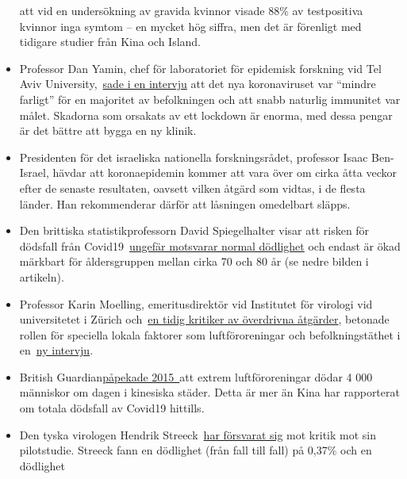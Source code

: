 \begin{itemize}
  att vid en undersökning av gravida kvinnor visade 88\% av testpositiva
  kvinnor inga symtom -- en mycket hög siffra, men det är förenligt med
  tidigare studier från Kina och Island.
\item
  Professor Dan Yamin, chef för laboratoriet för epidemisk forskning vid
  Tel Aviv
  University,~\href{https://www.timesofisrael.com/top-israeli-prof-claims-simple-stats-show-virus-plays-itself-out-after-70-days/}{sade
  i en intervju} att det nya koronaviruset var ``mindre farligt'' för en
  majoritet av befolkningen och att snabb naturlig immunitet var målet.
  Skadorna som orsakats av ett lockdown är enorma, med dessa pengar är
  det bättre att bygga en ny klinik.
\item
  Presidenten för det israeliska nationella forskningsrådet, professor
  Isaac Ben-Israel, hävdar att koronaepidemin kommer att vara över om
  cirka åtta veckor efter de senaste resultaten, oavsett vilken åtgärd
  som vidtas, i de flesta länder. Han rekommenderar därför att låsningen
  omedelbart släpps.
\item
  Den brittiska statistikprofessorn David Spiegelhalter visar att risken
  för dödsfall från
  Covid19~\href{https://medium.com/wintoncentre/how-much-normal-risk-does-covid-represent-4539118e1196}{ungefär
  motsvarar normal dödlighet} och endast är ökad märkbart för
  åldersgruppen mellan cirka 70 och 80 år (se nedre bilden i artikeln).
\item
  Professor Karin Moelling, emeritusdirektör vid Institutet för virologi
  vid universitetet i Zürich
  och~\href{https://www.rubikon.news/artikel/die-stimme-der-vernunft}{en
  tidig kritiker av överdrivna åtgärder}, betonade rollen för speciella
  lokala faktorer som luftföroreningar och befolkningstäthet i
  en~\href{https://www.youtube.com/watch?v=4rl2sqLcDoQ}{ny intervju}.
\item
  British
  Guardian\href{https://www.theguardian.com/world/2015/aug/14/air-pollution-in-china-is-killing-4000-people-every-day-a-new-study-finds}{påpekade
  2015~}att extrem luftföroreningar dödar 4 000 människor om dagen i
  kinesiska städer. Detta är mer än Kina har rapporterat om totala
  dödsfall av Covid19 hittills.
\item
  Den tyska virologen Hendrik
  Streeck~\href{https://www.tagesspiegel.de/wissen/virologe-streeck-zur-coronavirus-studie-die-veroeffentlichung-zu-heinsberg-war-nicht-leichtfertig/25735672.html}{har
  försvarat sig} mot kritik mot sin pilotstudie. Streeck fann en
  dödlighet (från fall till fall) på 0,37\% och en dödlighet

\end{itemize}
